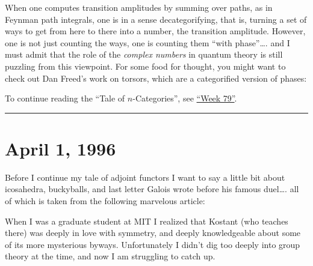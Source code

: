 \documentclass{article}
\def\tightlist{}
\renewcommand{\texttt}[1]{%
  \begingroup
  \ttfamily
  \begingroup\lccode`~=`/\lowercase{\endgroup\def~}{/\discretionary{}{}{}}%
  \begingroup\lccode`~=`[\lowercase{\endgroup\def~}{[\discretionary{}{}{}}%
  \begingroup\lccode`~=`.\lowercase{\endgroup\def~}{.\discretionary{}{}{}}%
  \catcode`/=\active\catcode`[=\active\catcode`.=\active
  \scantokens{#1\noexpand}%
  \endgroup
}
\begin{document}
When one computes transition amplitudes by summing over paths, as in
Feynman path integrals, one is in a sense decategorifying, that is,
turning a set of ways to get from here to there into a number, the
transition amplitude. However, one is not just counting the ways, one is
counting them ``with phase''\ldots. and I must admit that the role of
the \emph{complex numbers} in quantum theory is still puzzling from this
viewpoint. For some food for thought, you might want to check out Dan
Freed's work on torsors, which are a categorified version of phases:


To continue reading the ``Tale of \(n\)-Categories'', see
\protect\hyperlink{week79}{``Week 79''}.

\begin{center}\rule{0.5\linewidth}{0.5pt}\end{center}



\hypertarget{week79}{%
\section{April 1, 1996}\label{week79}}

Before I continue my tale of adjoint functors I want to say a little bit
about icosahedra, buckyballs, and last letter Galois wrote before his
famous duel\ldots. all of which is taken from the following marvelous
article:


When I was a graduate student at MIT I realized that Kostant (who
teaches there) was deeply in love with symmetry, and deeply
knowledgeable about some of its more mysterious byways. Unfortunately I
didn't dig too deeply into group theory at the time, and now I am
struggling to catch up.
\end{document}
